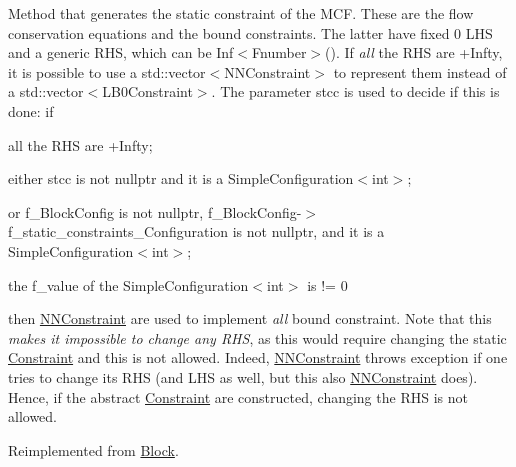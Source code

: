 Method that generates the static constraint of the M\+CF. These are the flow conservation equations and the bound constraints. The latter have fixed 0 L\+HS and a generic R\+HS, which can be Inf$<$\+Fnumber$>$(). If {\itshape all} the R\+HS are +\+Infty, it is possible to use a std\+::vector$<$\+N\+N\+Constraint$>$ to represent them instead of a std\+::vector$<$\+L\+B0\+Constraint$>$. The parameter stcc is used to decide if this is done\+: if


\begin{DoxyItemize}
\item all the R\+HS are +\+Infty;
\begin{DoxyItemize}
\item either stcc is not nullptr and it is a Simple\+Configuration$<$int$>$;
\end{DoxyItemize}
\item or f\+\_\+\+Block\+Config is not nullptr, f\+\_\+\+Block\+Config-\/$>$f\+\_\+static\+\_\+constraints\+\_\+\+Configuration is not nullptr, and it is a Simple\+Configuration$<$int$>$;
\item the f\+\_\+value of the Simple\+Configuration$<$int$>$ is != 0
\end{DoxyItemize}

then \mbox{\hyperlink{class_s_m_spp__di__unipi__it_1_1_n_n_constraint}{N\+N\+Constraint}} are used to implement {\itshape all} bound constraint. Note that this {\itshape makes it impossible to change any R\+HS}, as this would require changing the static \mbox{\hyperlink{class_s_m_spp__di__unipi__it_1_1_constraint}{Constraint}} and this is not allowed. Indeed, \mbox{\hyperlink{class_s_m_spp__di__unipi__it_1_1_n_n_constraint}{N\+N\+Constraint}} throws exception if one tries to change its R\+HS (and L\+HS as well, but this also \mbox{\hyperlink{class_s_m_spp__di__unipi__it_1_1_n_n_constraint}{N\+N\+Constraint}} does). Hence, if the abstract \mbox{\hyperlink{class_s_m_spp__di__unipi__it_1_1_constraint}{Constraint}} are constructed, changing the R\+HS is not allowed. 

Reimplemented from \mbox{\hyperlink{class_s_m_spp__di__unipi__it_1_1_block_add9b4c918157bda66b5183f67953d49b}{Block}}.

\mbox{\label{class_s_m_spp__di__unipi__it_1_1_m_c_f_block_a599bd50cdc6123555aa4a6c4e22c996d}} 
